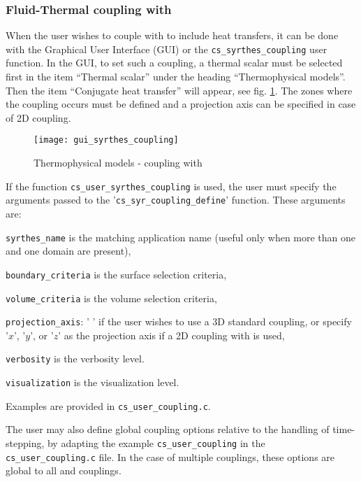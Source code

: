 {{%
\subsubsection{Fluid-Thermal coupling with \syrthes}
When the user wishes to couple \CS with \syrthes to include heat transfers, it can be 
done with the Graphical User Interface (GUI) or the
\texttt{cs\_syrthes\_coupling} user function.
In the GUI, to set such a coupling, a thermal scalar must be 
selected first in the item ``Thermal scalar'' under the heading ``Thermophysical models''.
 Then the item ``Conjugate heat transfer'' will appear, see fig. \ref{fig:syrthes}.
 The zones where the coupling occurs must be defined and a projection axis can be 
specified in case of 2D coupling.

\begin{figure}[ht]
\begin{center}
\texttt{[image: gui\_syrthes\_coupling]}
\caption{Thermophysical models - coupling with \syrthes}
\label{fig:syrthes}
\end{center}
\end{figure}

If the function \texttt{cs\_user\_syrthes\_coupling} is used, the user must
specify the arguments passed to the '\texttt{cs\_syr\_coupling\_define}' function.
 These arguments are:
\begin{list}{-}{}
 \item \texttt{syrthes\_name} is the matching \syrthes application name (useful only when more than one \syrthes and one \CS domain are present),
 \item \texttt{boundary\_criteria} is the surface selection criteria,
 \item \texttt{volume\_criteria} is the volume selection criteria,
 \item \texttt{projection\_axis}: ' ' if the user wishes to use a 3D standard coupling,
 or specify '$x$', '$y$', or '$z$' as the projection axis if a 2D coupling with \syrthes is used,
 \item \texttt{verbosity} is the verbosity level.
 \item \texttt{visualization} is the visualization level.
\end{list}
Examples are provided in \texttt{cs\_user\_coupling.c}.

The user may also define global coupling options relative to the handling of
time-stepping, by adapting the example \texttt{cs\_user\_coupling}
in the \texttt{cs\_user\_coupling.c} file. In the case of multiple couplings,
these options are global to all \syrthes and \CS couplings.

}}
